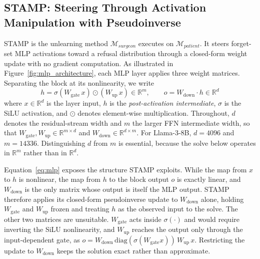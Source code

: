 \subsection{STAMP: Steering Through Activation Manipulation with Pseudoinverse}
\label{sec:stamp}
STAMP is the unlearning method $\mathcal{M}_{\textit{surgeon}}$ executes on $\mathcal{M}_{\textit{patient}}$. It steers forget-set MLP activations toward a refusal distribution through a closed-form weight update with no gradient computation. As illustrated in Figure~\ref{fig:mlp_architecture}, each MLP layer applies three weight matrices. Separating the block at its nonlinearity, we write
\begin{equation}
h = \sigma(W_{\mathrm{gate}}\, x) \odot (W_{\mathrm{up}}\, x) \in \mathbb{R}^{m},
\qquad
o = W_{\mathrm{down}} \cdot h \in \mathbb{R}^{d}
\label{eq:mlp}
\end{equation}
where $x \in \mathbb{R}^{d}$ is the layer input, $h$ is the \textit{post-activation intermediate}, $\sigma$ is the SiLU activation, and $\odot$ denotes element-wise multiplication. Throughout, $d$ denotes the residual-stream width and $m$ the larger FFN intermediate width, so that $W_{\mathrm{gate}}, W_{\mathrm{up}} \in \mathbb{R}^{m \times d}$ and $W_{\mathrm{down}} \in \mathbb{R}^{d \times m}$. For Llama-3-8B, $d = 4096$ and $m = 14336$. Distinguishing $d$ from $m$ is essential, because the solve below operates in $\mathbb{R}^{m}$ rather than in $\mathbb{R}^{d}$.

Equation~\eqref{eq:mlp} exposes the structure STAMP exploits. While the map from $x$ to $h$ is nonlinear, the map from $h$ to the block output $o$ is exactly linear, and $W_{\mathrm{down}}$ is the only matrix whose output is itself the MLP output. STAMP therefore applies its closed-form pseudoinverse update to $W_{\mathrm{down}}$ alone, holding $W_{\mathrm{gate}}$ and $W_{\mathrm{up}}$ frozen and treating $h$ as the observed input to the solve. The other two matrices are unsuitable. $W_{\mathrm{gate}}$ acts inside $\sigma(\cdot)$ and would require inverting the SiLU nonlinearity, and $W_{\mathrm{up}}$ reaches the output only through the input-dependent gate, as $o = W_{\mathrm{down}}\,\mathrm{diag}(\sigma(W_{\mathrm{gate}}x))\,W_{\mathrm{up}}\,x$. Restricting the update to $W_{\mathrm{down}}$ keeps the solution exact rather than approximate.


